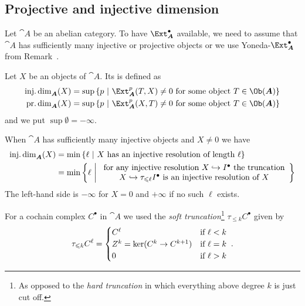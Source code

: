 \documentclass[a4paper,parskip=half,numbers=enddot, DIV=12]{scrreprt}
\renewcommand{\leq}{\leqslant}
\begin{document}
\subsection{Projective and injective dimension}
Let ${\cat A}$ be an abelian category. To have $\Ext_{\cat A}^\bullet$ available, we need to assume that ${\cat A}$ has sufficiently many injective or projective objects or we use Yoneda-$\Ext_{\cat A}^\bullet$ from Remark~.
\begin{defi}
	Let $X$ be an objects of ${\cat A}$. Its  is defined as
	\begin{align*}
		\idim_{\cat A}(X)&=\sup\left\{p\st \Ext_{\cat A}^p(T,X)\neq 0\text{ for some object }T\in\Ob({\cat A})\right\}\\
		\pdim_{\cat A}(X)&=\sup\left\{p\st \Ext_{\cat A}^p(X,T)\neq 0\text{ for some object }T\in\Ob({\cat A})\right\}
	\end{align*}
	and we put $\sup\emptyset =-\infty$.
\end{defi}
\begin{fact}
	When ${\cat A}$ has sufficiently many injective objects and $X\neq 0$ we have
	\begin{align*}
		\idim_{\cat A}(X)&=\min\left\{\ell\st X\text{ has an injective resolution of length }\ell\right\}\\
	&=	\min\left\{\ell\st\begin{array}{c}
	\text{for any injective resolution }X\monomorphism I^\bullet\text{ the truncation}\\
	X\monomorphism\tau_{\leq\ell}I^\bullet\text{ is an injective resolution of }X
	\end{array}
	\right\}
	\end{align*}
	The left-hand side is $-\infty$ for $X=0$ and $+\infty$ if no such $\ell$ exists. 
\end{fact}
For a cochain complex $C^\bullet$ in ${\cat A}$ we used the \emph{soft truncation}\footnote{As opposed to the \emph{hard truncation} in which everything above degree $k$ is just cut off.} $\tau_{\leq k}C^\bullet$ given by 
\begin{align*}
	\tau_{\leq k}C^\ell=\begin{cases}
	C^\ell & \text{if }\ell<k\\
	Z^k=\ker(C^k\morphism C^{k+1}) & \text{if }\ell=k\\
	0 & \text{if }\ell>k
	\end{cases}\;.
\end{align*}
\end{document}

